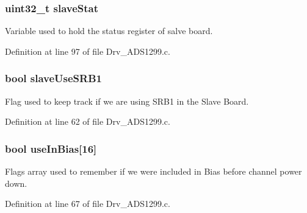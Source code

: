 \subsubsection[{\texorpdfstring{slave\+Stat}{slaveStat}}]{\setlength{\rightskip}{0pt plus 5cm}uint32\+\_\+t slave\+Stat}\hypertarget{group__ADS1299__Library_ga107f0202d1ef78dcc5b63e143044ffdf}{}\label{group__ADS1299__Library_ga107f0202d1ef78dcc5b63e143044ffdf}


Variable used to hold the status register of salve board. 



Definition at line 97 of file Drv\+\_\+\+A\+D\+S1299.\+c.

\subsubsection[{\texorpdfstring{slave\+Use\+S\+R\+B1}{slaveUseSRB1}}]{\setlength{\rightskip}{0pt plus 5cm}bool slave\+Use\+S\+R\+B1}\hypertarget{group__ADS1299__Library_gab67cf8829f1fda0edfe4fcb89a00f8d1}{}\label{group__ADS1299__Library_gab67cf8829f1fda0edfe4fcb89a00f8d1}


Flag used to keep track if we are using S\+R\+B1 in the Slave Board. 



Definition at line 62 of file Drv\+\_\+\+A\+D\+S1299.\+c.

\subsubsection[{\texorpdfstring{use\+In\+Bias}{useInBias}}]{\setlength{\rightskip}{0pt plus 5cm}bool use\+In\+Bias\mbox{[}16\mbox{]}}\hypertarget{group__ADS1299__Library_gaab7b7dca51dd80f61785f355b03b0555}{}\label{group__ADS1299__Library_gaab7b7dca51dd80f61785f355b03b0555}


Flags array used to remember if we were included in Bias before channel power down. 



Definition at line 67 of file Drv\+\_\+\+A\+D\+S1299.\+c.

